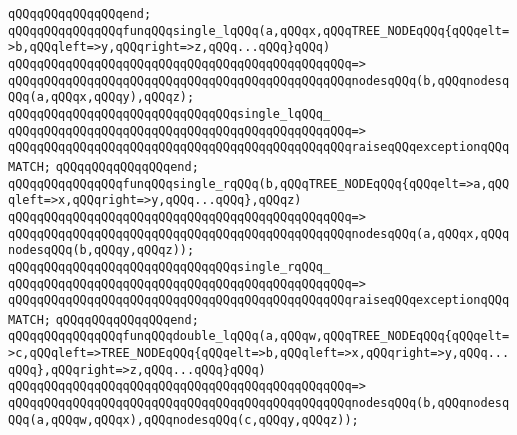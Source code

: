 \verb|qQQqqQQqqQQqqQQqend;|\newline
\newline
\newline
\verb|qQQqqQQqqQQqqQQqfunqQQqsingle_lqQQq(a,qQQqx,qQQqTREE_NODEqQQq{qQQqelt=>b,qQQqleft=>y,qQQqright=>z,qQQq...qQQq}qQQq)|\newline
\verb|qQQqqQQqqQQqqQQqqQQqqQQqqQQqqQQqqQQqqQQqqQQqqQQq=>|\newline
\verb|qQQqqQQqqQQqqQQqqQQqqQQqqQQqqQQqqQQqqQQqqQQqqQQqnodesqQQq(b,qQQqnodesqQQq(a,qQQqx,qQQqy),qQQqz);|\newline
\newline
\verb|qQQqqQQqqQQqqQQqqQQqqQQqqQQqqQQqsingle_lqQQq_|\newline
\verb|qQQqqQQqqQQqqQQqqQQqqQQqqQQqqQQqqQQqqQQqqQQqqQQq=>|\newline
\verb|qQQqqQQqqQQqqQQqqQQqqQQqqQQqqQQqqQQqqQQqqQQqqQQqraiseqQQqexceptionqQQqMATCH;|\newline
\verb|qQQqqQQqqQQqqQQqend;|\newline
\newline
\newline
\verb|qQQqqQQqqQQqqQQqfunqQQqsingle_rqQQq(b,qQQqTREE_NODEqQQq{qQQqelt=>a,qQQqleft=>x,qQQqright=>y,qQQq...qQQq},qQQqz)|\newline
\verb|qQQqqQQqqQQqqQQqqQQqqQQqqQQqqQQqqQQqqQQqqQQqqQQq=>|\newline
\verb|qQQqqQQqqQQqqQQqqQQqqQQqqQQqqQQqqQQqqQQqqQQqqQQqnodesqQQq(a,qQQqx,qQQqnodesqQQq(b,qQQqy,qQQqz));|\newline
\newline
\verb|qQQqqQQqqQQqqQQqqQQqqQQqqQQqqQQqsingle_rqQQq_|\newline
\verb|qQQqqQQqqQQqqQQqqQQqqQQqqQQqqQQqqQQqqQQqqQQqqQQq=>|\newline
\verb|qQQqqQQqqQQqqQQqqQQqqQQqqQQqqQQqqQQqqQQqqQQqqQQqraiseqQQqexceptionqQQqMATCH;|\newline
\verb|qQQqqQQqqQQqqQQqend;|\newline
\newline
\newline
\verb|qQQqqQQqqQQqqQQqfunqQQqdouble_lqQQq(a,qQQqw,qQQqTREE_NODEqQQq{qQQqelt=>c,qQQqleft=>TREE_NODEqQQq{qQQqelt=>b,qQQqleft=>x,qQQqright=>y,qQQq...qQQq},qQQqright=>z,qQQq...qQQq}qQQq)|\newline
\verb|qQQqqQQqqQQqqQQqqQQqqQQqqQQqqQQqqQQqqQQqqQQqqQQq=>|\newline
\verb|qQQqqQQqqQQqqQQqqQQqqQQqqQQqqQQqqQQqqQQqqQQqqQQqnodesqQQq(b,qQQqnodesqQQq(a,qQQqw,qQQqx),qQQqnodesqQQq(c,qQQqy,qQQqz));|\newline
